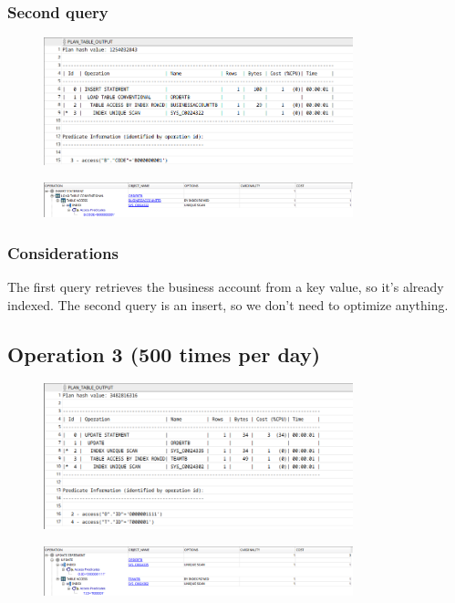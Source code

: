 \subsubsection*{Second query}
\begin{figure}[H]
    \centering
    \includegraphics[width=0.8\textwidth]{img/phys/op2-2.png}
\end{figure}
\begin{figure}[H]
    \centering
    \includegraphics[width=0.8\textwidth]{img/phys/op2-4.png}
\end{figure}

\subsubsection*{Considerations}
The first query retrieves the business account from a key value, so it's already indexed. The second query is an insert, so we don't need to optimize anything.

\subsection*{Operation 3 (500 times per day)}
\begin{figure}[H]
    \centering
    \includegraphics[width=0.8\textwidth]{img/phys/op3-1.png}
\end{figure}
\begin{figure}[H]
    \centering
    \includegraphics[width=0.8\textwidth]{img/phys/op3-2.png}
\end{figure}
